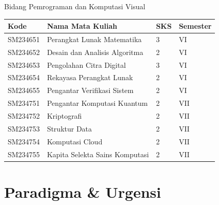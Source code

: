 \documentclass[aspectratio=169]{beamer} %
\begin{document}
\begin{frame}{Bidang Pemrograman dan Komputasi Visual}

\begin{table}
	\renewcommand{\arraystretch}{1.3}
	\setlength{\tabcolsep}{10pt}
	\begin{tabular}{l l l l}
		\toprule
		\textbf{Kode} & \textbf{Nama Mata Kuliah} & \textbf{SKS} & \textbf{Semester} \\
		\midrule
		SM234651 & Perangkat Lunak Matematika & 3 & VI \\
		SM234652 & Desain dan Analisis Algoritma & 2 & VI \\
		SM234653 & Pengolahan Citra Digital & 3 & VI \\
		SM234654 & Rekayasa Perangkat Lunak & 2 & VI \\
		SM234655 & Pengantar Verifikasi Sistem & 2 & VI \\
		SM234751 & Pengantar Komputasi Kuantum & 2 & VII \\
		SM234752 & Kriptografi & 2 & VII \\
		SM234753 & Struktur Data & 2 & VII \\
		SM234754 & Komputasi Cloud & 2 & VII \\
		SM234755 & Kapita Selekta Sains Komputasi & 2 & VII \\
		\bottomrule
	\end{tabular}
\end{table}

\end{frame}

\section{Paradigma \& Urgensi}
\end{document}
